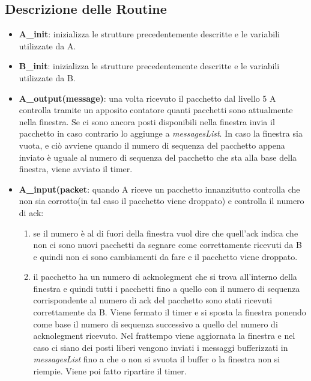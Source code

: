 \documentclass[a4paper]{article}
\begin{document}
\subsection{Descrizione delle Routine}
\begin{itemize}

\item \textbf{A\_init}: inizializza le strutture precedentemente descritte e le variabili utilizzate da A.

\item \textbf{B\_init}: inizializza le strutture precedentemente descritte e le variabili utilizzate da B.

\item \textbf{A\_output(message)}: una volta ricevuto il pacchetto dal livello 5 A controlla tramite un apposito contatore quanti pacchetti sono attualmente nella finestra. Se ci sono ancora posti disponibili nella finestra invia il pacchetto in caso contrario lo aggiunge a \emph{messagesList}. In caso la finestra sia vuota, e ciò avviene quando il numero di sequenza del pacchetto appena inviato è uguale al numero di sequenza del pacchetto che sta alla base della finestra, viene avviato il timer.

\item \textbf{A\_input(packet}: quando A riceve un pacchetto innanzitutto controlla che non sia corrotto(in tal caso il pacchetto viene droppato) e controlla il numero di ack: 

\begin{enumerate}

\item se il numero è al di fuori della finestra vuol dire che quell'ack indica che non ci sono nuovi pacchetti da segnare come correttamente ricevuti da B e quindi non ci sono cambiamenti da fare e il pacchetto viene droppato.

\item il pacchetto ha un numero di acknolegment che si trova all'interno della finestra e quindi tutti i pacchetti fino a quello con il numero di sequenza corrispondente al numero di ack del pacchetto sono stati ricevuti correttamente da B. Viene fermato il timer e si sposta la finestra ponendo come base il numero di sequenza successivo a quello del numero di acknolegment ricevuto. Nel frattempo viene aggiornata la finestra e nel caso ci siano dei posti liberi vengono inviati i messaggi bufferizzati in \emph{messagesList} fino a che o non si svuota il buffer o la finestra non si riempie. Viene poi fatto ripartire il timer.


\end{enumerate}
\end{itemize}
\end{document}
